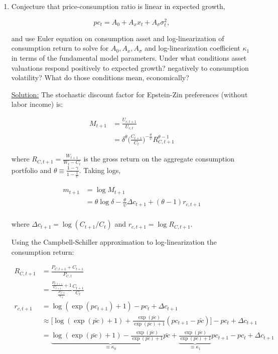 \documentclass{article}
\begin{document}
\begin{enumerate}

\item Conjecture that price-consumption ratio is linear in expected growth,

$$
pc_t = A_0 + A_x x_t + A_\sigma \sigma_t^2,
$$

and use Euler equation on consumption asset and log-linearization of consumption return to solve for $A_0,A_x,A_\sigma$ and log-linearization coefficient $\kappa_1$ in terms of the fundamental model parameters. Under what conditions asset valuations respond positively to expected growth? negatively to consumption volatility? What do those conditions mean, economically?

\bigskip

\underline{Solution:}  The stochastic discount factor for Epstein-Zin preferences (without labor income) is:

\begin{align*}
M_{t+1} 
&= \frac{U_{c,t+1}}{U_{c,t}}\\
&= \delta^{\theta}\Bigg(\frac{C_{t+1}}{C_t}\Bigg)^{-\frac{\theta}{\psi}} R_{C,t+1}^{\theta-1}
\end{align*}

where $R_{C,t+1} = \frac{W_{t+1}}{W_t - C_t}$ is the gross return on the aggregate consumption portfolio and $\theta \equiv \frac{1-\gamma}{1 - \frac{1}{\psi}}$.  Taking logs,

\begin{align*}
m_{t+1} 
&= \log M_{t+1}\\
&= \theta \log \delta - \frac{\theta}{\psi} \Delta c_{t+1} + (\theta - 1) r_{c,t+1}\\
\end{align*}

where $\Delta c_{t+1} = \log(C_{t+1}/C_t)$ and $r_{c,t+1} = \log R_{C,t+1}$.  

\pagebreak

Using the Campbell-Schiller approximation to log-linearization the consumption return:

\begin{align*}
R_{C,t+1} 
&= \frac{P_{C,t+1} + C_{t+1}}{P_{C,t}} \\
&=  \frac{\frac{P_{C,t+1}}{C_{t+1}} + 1}{\frac{P_{C,t}}{C_t}} \frac{C_{t+1}}{C_{t}}\\
r_{c,t+1} 
&= \log(\exp(pc_{t+1}) +1) - pc_t +\Delta c_{t+1} \\
&\approx \Bigg[\log(\exp(\bar{pc}) +1) + \frac{\exp(\bar{pc})}{\exp(\bar{pc}) + 1} (pc_{t+1} - \bar{pc})\Bigg]- pc_t +\Delta c_{t+1} \\
&= \underbrace{\log(\exp(\bar{pc}) +1)- \frac{\exp(\bar{pc})}{\exp(\bar{pc}) + 1} \bar{pc}}_{\equiv \kappa_0} + \underbrace{\frac{\exp(\bar{pc})}{\exp(\bar{pc}) + 1}}_{\equiv \kappa_1} pc_{t+1} - pc_t +\Delta c_{t+1} 
\end{align*}


\end{enumerate}
\end{document}

